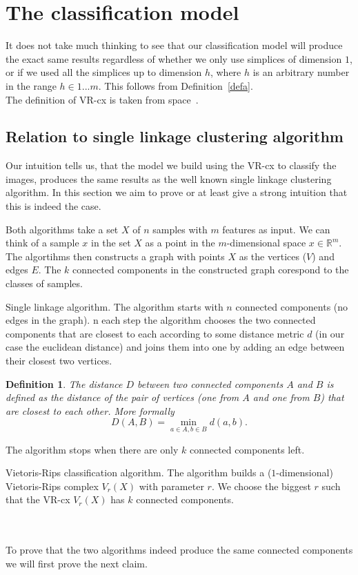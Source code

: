 \documentclass{article}
\newcommand{\enterProblemHeader}[1]{
}
\newcommand{\exitProblemHeader}[1]{
}
\newcounter{homeworkProblemCounter} %
\newcommand{\homeworkProblemName}{}
\newenvironment{homeworkProblem}[1][Problem \arabic{homeworkProblemCounter}]{ %
\stepcounter{homeworkProblemCounter} %
\renewcommand{\homeworkProblemName}{#1} %
\section{\homeworkProblemName} %
\enterProblemHeader{\homeworkProblemName} %
}{
\exitProblemHeader{\homeworkProblemName} %
}
\newcommand{\homeworkSectionName}{}
\newenvironment{homeworkSection}[1]{ %
\renewcommand{\homeworkSectionName}{#1} %
\subsection{\homeworkSectionName} %
\enterProblemHeader{\homeworkProblemName\ [\homeworkSectionName]} %
}{
\enterProblemHeader{\homeworkProblemName} %
}
\newtheorem{definition}{Definition}
\begin{document}
\begin{homeworkProblem}[The classification model]
It does not take much thinking to see that our classification model will produce the exact same results regardless of whether we only use simplices of dimension $1$, or if we used all the simplices up to dimension $h$, where $h$ is an arbitrary number in the range $h \in 1...m$. This follows from Definition~\ref{defa}.\\

The definition of VR-cx is taken from space~\cite{dyinglovegrape}.

\label{sec:relationsl}
\begin{homeworkSection}{Relation to single linkage clustering algorithm}


Our intuition tells us, that the model we build using the VR-cx to classify the images, produces the same results as the well known single linkage clustering algorithm. In this section we aim to prove or at least give a strong intuition that this is indeed the case.

Both algorithms take a set $X$ of $n$ samples with $m$ features as input. We can think of a sample $x$ in the set $X$ as a point in the $m$-dimensional space $x \in \mathbb{R}^{m}$. The algortihms then constructs a graph with points $X$ as the vertices ($V$) and edges $E$. The $k$ connected components in the constructed graph corespond to the classes of samples.

\begin{paragraph}{Single linkage algorithm.}
The algorithm starts with $n$ connected components (no edges in the graph). n each step the algorithm chooses the two connected components that are closest to each according to some distance metric $d$ (in our case the euclidean distance) and joins them into one by adding an edge between their closest two vertices.

\begin{definition}
The distance $D$ between two connected components $A$ and $B$ is defined as the distance of the pair of vertices (one from $A$ and one from $B$) that are closest to each other. More formally
$$D(A, B) =  \min_{a \in A, b \in B} d(a,b).$$
\end{definition}

The algorithm stops when there are only $k$ connected components left.

\end{paragraph}

\begin{paragraph}{Vietoris-Rips classification algorithm.}
The algorithm builds a ($1$-dimensional) Vietoris-Rips complex $V_{r}(X)$ with parameter $r$. We choose the biggest $r$ such that the VR-cx $V_{r}(X)$ has $k$ connected components.
\end{paragraph}
\\
\\
To prove that the two algorithms indeed produce the same connected components we will first prove the next claim.


\end{homeworkSection}
\end{homeworkProblem}
\end{document}
